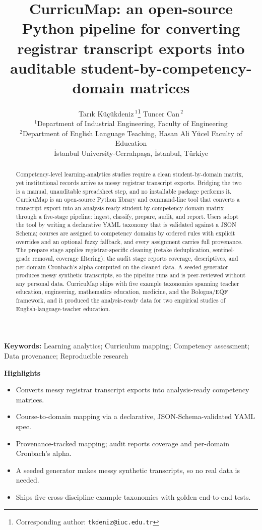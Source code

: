 \documentclass[11pt]{article}
\title{CurricuMap: an open-source Python pipeline for converting
registrar transcript exports into auditable
student-by-competency-domain matrices}
\author{%
Tar{\i}k K\"u\c{c}\"ukdeniz\,$^{1}$\thanks{Corresponding author: \texttt{tkdeniz@iuc.edu.tr}}
\quad Tuncer Can\,$^{2}$ \\[4pt]
\small $^{1}$Department of Industrial Engineering, Faculty of Engineering \\
\small $^{2}$Department of English Language Teaching, Hasan Ali Y\"ucel Faculty of Education \\
\small \.Istanbul University-Cerrahpa\c{s}a, \.Istanbul, T\"urkiye}
\date{}
\begin{document}
\maketitle

\begin{abstract}
Competency-level learning-analytics studies require a clean
student-by-domain matrix, yet institutional records arrive as messy
registrar transcript exports. Bridging the two is a manual, unauditable
spreadsheet step, and no installable package performs it. CurricuMap is
an open-source Python library and command-line tool that converts a
transcript export into an analysis-ready student-by-competency-domain
matrix through a five-stage pipeline: ingest, classify, prepare, audit,
and report. Users adopt the tool by writing a declarative YAML taxonomy
that is validated against a JSON Schema; courses are assigned to
competency domains by ordered rules with explicit overrides and an
optional fuzzy fallback, and every assignment carries full provenance.
The prepare stage applies registrar-specific cleaning (retake
deduplication, sentinel-grade removal, coverage filtering); the audit
stage reports coverage, descriptives, and per-domain Cronbach's alpha
computed on the cleaned data. A seeded generator produces messy
synthetic transcripts, so the pipeline runs and is peer-reviewed
without any personal data. CurricuMap ships with five example taxonomies
spanning teacher education, engineering, mathematics education, medicine,
and the Bologna/EQF framework, and it produced the analysis-ready data
for two empirical studies of English-language-teacher education.
\end{abstract}

\noindent\textbf{Keywords:} Learning analytics; Curriculum mapping;
Competency assessment; Data provenance; Reproducible research

\vspace{0.6em}
\noindent\textbf{Highlights}
\begin{itemize}[nosep,leftmargin=1.4em]
  \item Converts messy registrar transcript exports into analysis-ready competency matrices.
  \item Course-to-domain mapping via a declarative, JSON-Schema-validated YAML spec.
  \item Provenance-tracked mapping; audit reports coverage and per-domain Cronbach's alpha.
  \item A seeded generator makes messy synthetic transcripts, so no real data is needed.
  \item Ships five cross-discipline example taxonomies with golden end-to-end tests.
\end{itemize}
\end{document}
